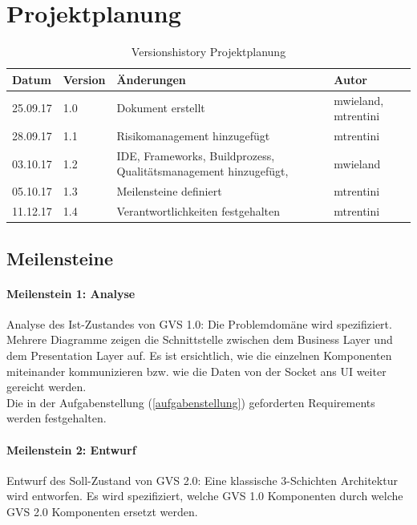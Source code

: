 \documentclass[11pt,a4paper,english,oneside]{book}
\numberwithin{equation}{chapter}
\begin{document}
	
	\newpage
	
	\appendix
	\noappendicestocpagenum
	\addappheadtotoc
	\appendixpage
	
	\chapter{Projektplanung}
	
	\begin{table}[h!]
		\centering
		\begin{tabularx}{\linewidth}{l l X l}
			\toprule 
			Datum & Version & Änderungen & Autor \\
			\midrule
			25.09.17 & 1.0 & Dokument erstellt & mwieland, mtrentini \\
			28.09.17 & 1.1 & Risikomanagement hinzugefügt & mtrentini \\
			03.10.17 & 1.2 & IDE, Frameworks, Buildprozess, Qualitätsmanagement hinzugefügt, & mwieland \\
			05.10.17 & 1.3 & Meilensteine definiert & mtrentini \\
			11.12.17 & 1.4 & Verantwortlichkeiten festgehalten & mtrentini \\
			\bottomrule 
		\end{tabularx} 
		\caption{Versionshistory Projektplanung} 
	\end{table}
	
	
	
	\section{Meilensteine}
	\label{sec:milestones}
	
	\subsubsection{Meilenstein 1: Analyse}
	Analyse des Ist-Zustandes von GVS 1.0: Die Problemdomäne wird spezifiziert. Mehrere Diagramme zeigen die Schnittstelle zwischen dem Business Layer und dem Presentation Layer auf. Es ist ersichtlich, wie die einzelnen Komponenten miteinander kommunizieren bzw. wie die Daten von der Socket ans UI weiter gereicht werden.\\
	Die in der Aufgabenstellung (\ref{aufgabenstellung}) geforderten Requirements werden festgehalten.
	
	\subsubsection{Meilenstein 2: Entwurf}
	\label{milestone2}
	Entwurf des Soll-Zustand von GVS 2.0: Eine klassische 3-Schichten Architektur wird entworfen. Es wird spezifiziert, welche GVS 1.0 Komponenten durch welche GVS 2.0 Komponenten ersetzt werden. 
	
\end{document}
